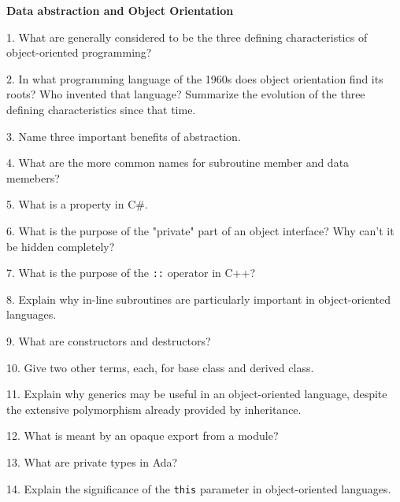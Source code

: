 \centerline{\bf Data abstraction and Object Orientation}

\vskip 1cm

1. What are generally considered to be the three defining characteristics of object-oriented programming?

\filbreak
\vskip 1cm

2. In what programming language of the 1960s does object orientation find its roots? Who invented that language? Summarize the evolution of the three defining characteristics since that time.

\filbreak
\vskip 1cm

3. Name three important benefits of abstraction.

\filbreak
\vskip 1cm

4. What are the more common names for subroutine member and data memebers?

\filbreak
\vskip 1cm

5. What is a property in C$\#$.

\filbreak
\vskip 1cm

6. What is the purpose of the "private" part of an object interface? Why can't it be hidden completely?

\filbreak
\vskip 1cm

7. What is the purpose of the {\tt ::} operator in C++?

\filbreak
\vskip 1cm

8. Explain why in-line subroutines are particularly important in object-oriented languages.

\filbreak
\vskip 1cm

9. What are constructors and destructors?

\filbreak
\vskip 1cm

10. Give two other terms, each, for base class and derived class.

\filbreak
\vskip 1cm

11. Explain why generics may be useful in an object-oriented language, despite the extensive polymorphism already provided by inheritance.

\filbreak
\vskip 1cm

12. What is meant by an opaque export from a module?

\filbreak
\vskip 1cm

13. What are private types in Ada?

\filbreak
\vskip 1cm

14. Explain the significance of the {\tt this} parameter in object-oriented languages.

